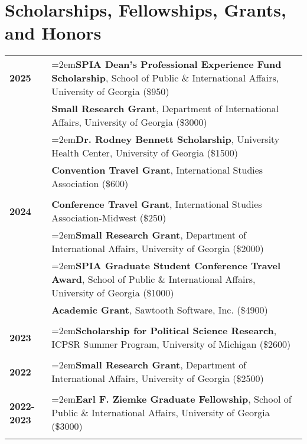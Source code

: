 \documentclass[letterpaper,12pt]{article}
\begin{document}
\section{Scholarships, Fellowships, Grants, and Honors}
\begin{xltabular}{\dimexpr\textwidth-0in}{p{.85in}X}
\textbf{2025}          & \hangindent=2em\textbf{SPIA Dean's Professional Experience Fund Scholarship}, School of Public \& \mbox{International} Affairs, University of Georgia (\$950)\\
                              & \textbf{Small Research Grant}, Department of International Affairs, University of Georgia (\$3000) \\
                              & \hangindent=2em\textbf{Dr. Rodney Bennett Scholarship}, University Health Center, University of Georgia (\$1500)\\
                              & \textbf{Convention Travel Grant}, International Studies Association (\$600)\\ \\
\textbf{2024}          & \textbf{Conference Travel Grant}, International Studies Association-Midwest (\$250)\\
                              & \hangindent=2em\textbf{Small Research Grant}, Department of International Affairs, University of Georgia (\$2000)\\
                              & \hangindent=2em\textbf{SPIA Graduate Student Conference Travel Award}, School of Public \& \mbox{International} Affairs, University of Georgia (\$1000)\\
                              & \textbf{Academic Grant}, Sawtooth Software, Inc. (\$4900)\\ \\
\textbf{2023}          & \hangindent=2em\textbf{Scholarship for Political Science Research}, ICPSR Summer Program, University of \mbox{Michigan} (\$2600)\\ \\
\textbf{2022}          & \hangindent=2em\textbf{Small Research Grant}, Department of International Affairs, University of Georgia (\$2500)\\ \\
\textbf{2022-2023} & \hangindent=2em\textbf{Earl F. Ziemke Graduate Fellowship}, School of Public \& International Affairs, \mbox{University} of Georgia (\$3000)\\ \\

\end{xltabular}
\end{document}
